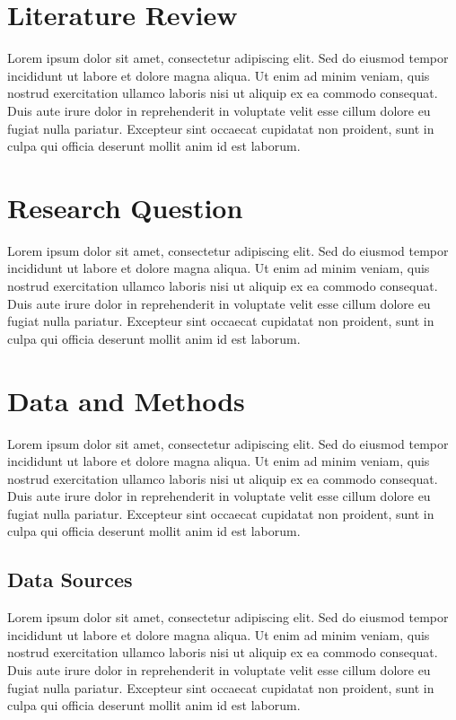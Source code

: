 \documentclass[
  12pt,
]{article}
\begin{document}
\section{Literature Review}\label{literature-review}

Lorem ipsum dolor sit amet, consectetur adipiscing elit. Sed do eiusmod
tempor incididunt ut labore et dolore magna aliqua. Ut enim ad minim
veniam, quis nostrud exercitation ullamco laboris nisi ut aliquip ex ea
commodo consequat. Duis aute irure dolor in reprehenderit in voluptate
velit esse cillum dolore eu fugiat nulla pariatur. Excepteur sint
occaecat cupidatat non proident, sunt in culpa qui officia deserunt
mollit anim id est laborum.

\section{Research Question}\label{research-question}

Lorem ipsum dolor sit amet, consectetur adipiscing elit. Sed do eiusmod
tempor incididunt ut labore et dolore magna aliqua. Ut enim ad minim
veniam, quis nostrud exercitation ullamco laboris nisi ut aliquip ex ea
commodo consequat. Duis aute irure dolor in reprehenderit in voluptate
velit esse cillum dolore eu fugiat nulla pariatur. Excepteur sint
occaecat cupidatat non proident, sunt in culpa qui officia deserunt
mollit anim id est laborum.

\section{Data and Methods}\label{data-and-methods}

Lorem ipsum dolor sit amet, consectetur adipiscing elit. Sed do eiusmod
tempor incididunt ut labore et dolore magna aliqua. Ut enim ad minim
veniam, quis nostrud exercitation ullamco laboris nisi ut aliquip ex ea
commodo consequat. Duis aute irure dolor in reprehenderit in voluptate
velit esse cillum dolore eu fugiat nulla pariatur. Excepteur sint
occaecat cupidatat non proident, sunt in culpa qui officia deserunt
mollit anim id est laborum.

\subsection{Data Sources}\label{data-sources}

Lorem ipsum dolor sit amet, consectetur adipiscing elit. Sed do eiusmod
tempor incididunt ut labore et dolore magna aliqua. Ut enim ad minim
veniam, quis nostrud exercitation ullamco laboris nisi ut aliquip ex ea
commodo consequat. Duis aute irure dolor in reprehenderit in voluptate
velit esse cillum dolore eu fugiat nulla pariatur. Excepteur sint
occaecat cupidatat non proident, sunt in culpa qui officia deserunt
mollit anim id est laborum.
\end{document}
